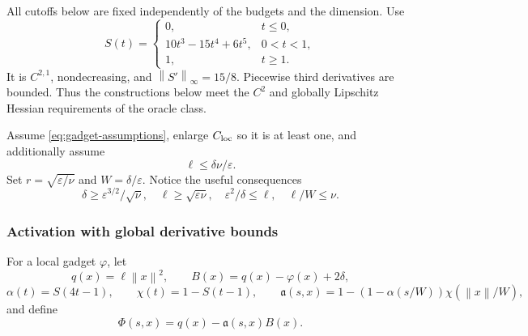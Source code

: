 \documentclass[11pt]{article}
\theoremstyle{remark}
\theoremstyle{remark}
\newcommand{\eps}{\varepsilon}
\newcommand{\norm}[1]{\left\lVert#1\right\rVert}
\begin{document}
All cutoffs below are fixed independently of the budgets and the dimension. Use
\[
 S(t)=\begin{cases}
 0,&t\le0,\\
 10t^3-15t^4+6t^5,&0<t<1,\\
 1,&t\ge1.
 \end{cases}
\]
It is $C^{2,1}$, nondecreasing, and $\norm{S'}_\infty=15/8$. Piecewise third derivatives are bounded. Thus the constructions below meet the $C^2$ and globally Lipschitz Hessian requirements of the oracle class.

Assume \eqref{eq:gadget-assumptions}, enlarge $C_{\rm loc}$ so it is at least one, and additionally assume
\begin{equation}\label{eq:wrapper-balance}
 \ell\le\delta\nu/\eps.
\end{equation}
Set $r=\sqrt{\eps/\nu}$ and $W=\delta/\eps$. Notice the useful consequences
\begin{equation}\label{eq:wrapper-scales}
 \delta\ge\eps^{3/2}/\sqrt\nu,\quad
 \ell\ge\sqrt{\eps\nu},\quad
 \eps^2/\delta\le\ell,\quad \ell/W\le\nu.
\end{equation}

\subsubsection{Activation with global derivative bounds}
For a local gadget $\varphi$, let
\[
 q(x)=\ell\norm x^2,\qquad
 B(x)=q(x)-\varphi(x)+2\delta,
\]
\[
 \alpha(t)=S(4t-1),\qquad \chi(t)=1-S(t-1),\qquad
 \mathfrak a(s,x)=1-(1-\alpha(s/W))\chi(\norm x/W),
\]
and define
\begin{equation}\label{eq:new-wrapper}
 \Phi(s,x)=q(x)-\mathfrak a(s,x)B(x).
\end{equation}
\end{document}
